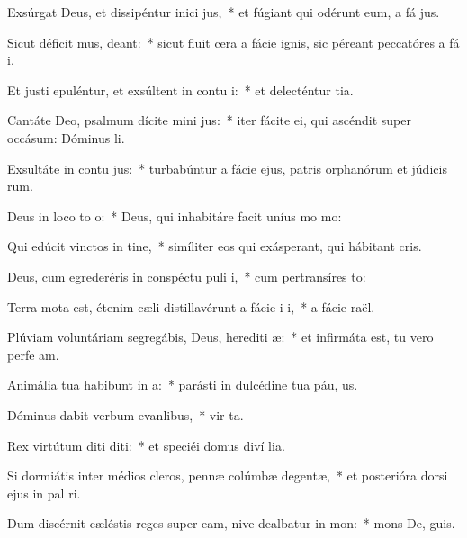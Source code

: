 \item Exsúrgat Deus, et dissipéntur inici jus,~* et fúgiant qui odérunt eum, a fá jus.
\item Sicut déficit mus, deant:~* sicut fluit cera a fácie ignis, sic péreant peccatóres a fá i.
\item Et justi epuléntur, et exsúltent in contu i:~* et delecténtur  tia.
\item Cantáte Deo, psalmum dícite mini jus:~* iter fácite ei, qui ascéndit super occásum: Dóminus  li.
\item Exsultáte in contu jus:~* turbabúntur a fácie ejus, patris orphanórum et júdicis rum.
\item Deus in loco to o:~* Deus, qui inhabitáre facit uníus mo  mo:
\item Qui edúcit vinctos in tine,~* simíliter eos qui exásperant, qui hábitant  cris.
\item Deus, cum egrederéris in conspéctu puli i,~* cum pertransíres  to:
\item Terra mota est, étenim cæli distillavérunt a fácie i i,~* a fácie  raël.
\item Plúviam voluntáriam segregábis, Deus, herediti æ:~* et infirmáta est, tu vero perfe am.
\item Animália tua habibunt in a:~* parásti in dulcédine tua páu, us.
\item Dóminus dabit verbum evanlibus,~* vir ta.
\item Rex virtútum diti diti:~* et speciéi domus diví lia.
\item Si dormiátis inter médios cleros, pennæ colúmbæ degentæ,~* et posterióra dorsi ejus in pal ri.
\item Dum discérnit cæléstis reges super eam, nive dealbatur in mon:~* mons De,  guis.
